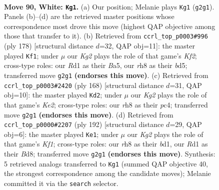 \documentclass[11pt]{article}
\begin{document}
\clearpage

\begin{figure}[p]\centering
\begin{subfigure}{0.46\textwidth}\centering
\resizebox{\linewidth}{!}{%
\newchessgame
\chessboard[
  setfen={7r/8/p3k3/P1p2p1p/1pp2P1P/4P1P1/1P4K1/3R4 w - - 0 90},
  showmover=false,
  pgfstyle=straightmove, color=movearrow, markmove={g2-g1}
]}
\caption{}
\end{subfigure}\hfill
\begin{subfigure}{0.46\textwidth}\centering
\resizebox{\linewidth}{!}{%
\newchessgame
\chessboard[
  setfen={8/4k3/5p2/B2b1Pp1/3Pp1Pp/4P2P/5K2/8 w - - 64 90},
  showmover=false,
  pgfstyle=straightmove, color=movearrow, markmove={f2-f1}
]}
\caption{}
\end{subfigure}
\\[4pt]
\begin{subfigure}{0.46\textwidth}\centering
\resizebox{\linewidth}{!}{%
\newchessgame
\chessboard[
  setfen={8/5k2/1p2p3/1P3p1p/2pP2pP/4P1P1/4KP2/8 w - - 0 85},
  showmover=false,
  pgfstyle=straightmove, color=movearrow, markmove={e2-d2}
]}
\caption{}
\end{subfigure}\hfill
\begin{subfigure}{0.46\textwidth}\centering
\resizebox{\linewidth}{!}{%
\newchessgame
\chessboard[
  setfen={3B4/5p1p/4p3/2k1PpP1/p4P2/P5P1/8/3b1K2 w - - 74 97},
  showmover=false,
  pgfstyle=straightmove, color=movearrow, markmove={f1-e1}
]}
\caption{}
\end{subfigure}
\caption{\textbf{Move 90, White: \texttt{Kg1}.} (a) Our position; Melanie plays \texttt{Kg1} (\texttt{g2g1}). Panels (b)--(d) are the retrieved master positions whose correspondence most drove this move (highest QAP objective among those that transfer to it). (b) Retrieved from \texttt{ccrl\_top\_p0003\#996} (ply 178) [structural distance $d$=32, QAP obj=11]: the master played \texttt{Kf1}; under $\mu$ our \emph{Kg2} plays the role of that game's \emph{Kf2}; cross-type roles: our \emph{R}d1 as their \emph{B}a5, our \emph{r}h8 as their \emph{b}d5; transferred move \texttt{g2g1} \textbf{(endorses this move)}. (c) Retrieved from \texttt{ccrl\_top\_p0003\#2420} (ply 168) [structural distance $d$=31, QAP obj=10]: the master played \texttt{Kd2}; under $\mu$ our \emph{Kg2} plays the role of that game's \emph{Ke2}; cross-type roles: our \emph{r}h8 as their \emph{p}c4; transferred move \texttt{g2g1} \textbf{(endorses this move)}. (d) Retrieved from \texttt{ccrl\_top\_p0000\#2207} (ply 192) [structural distance $d$=29, QAP obj=6]: the master played \texttt{Ke1}; under $\mu$ our \emph{Kg2} plays the role of that game's \emph{Kf1}; cross-type roles: our \emph{r}h8 as their \emph{b}d1, our \emph{R}d1 as their \emph{B}d8; transferred move \texttt{g2g1} \textbf{(endorses this move)}. Synthesis: 5 retrieved analogs transferred to \texttt{Kg1} (summed QAP objective 40, the strongest correspondence among the candidate moves); Melanie committed it via the \texttt{search} selector.}
\label{fig:thought-m178}
\end{figure}
\end{document}
